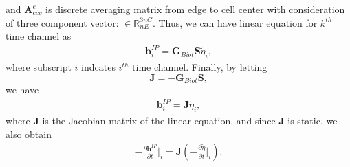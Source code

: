 \documentclass[a4paper, 11pt]{article}
\renewcommand{\div}{\nabla\cdot}
\newcommand{\grad}{\vec \nabla}
\newcommand{\dgrad}{{\mathbf G}}
\newcommand{\M}{{\mathbf M}}
\newcommand{\Me}{{\M^e}}
\newcommand {\e}  { {\vec e} }
\newcommand {\db}  { {\mathbf{b} } }
\newcommand {\de}  { {\mathbf{e} } }
\newcommand{\Gbiot}{\mathbf{G}_{Biot}}
\newcommand{\peta}{\tilde{\eta}}
\begin{document}
and $\mathbf{A}^{e}_{ccv}$ is discrete averaging matrix from edge to cell center with consideration of three component vector: $\in \mathbb{R}^{3nC}_{nE}$. 
Thus, we can have linear equation for $k^{th}$ time channel as
\begin{eqnarray*}
  \db^{IP}_i = \Gbiot \mathbf{S} \peta_i,
\end{eqnarray*}
where subscript $i$ indcates $i^{th}$ time channel. Finally, by letting
\begin{equation}
  \mathbf{J} = -\Gbiot\mathbf{S},
  \label{eq: Sense}
\end{equation}
we have
\begin{eqnarray}
  \db^{IP}_i = \mathbf{J}\peta_i,
  \label{eq: bIP_linear}
\end{eqnarray}
where $\mathbf{J}$ is the Jacobian matrix of the linear equation, and since $\mathbf{J}$ is static, we also obtain
\begin{eqnarray}
  -\frac{\partial\db^{IP}}{\partial t}\Big|_i = \mathbf{J}(-\frac{\partial \peta}{\partial t}\Big|_i).
  \label{eq: dbIPdt_linear}
\end{eqnarray}




\end{document}
